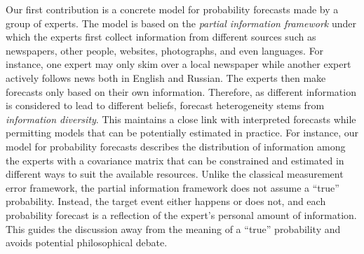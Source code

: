 \documentclass[11pt]{article}
\theoremstyle{definition}
\theoremstyle{definition}
\begin{document}
Our first contribution is a concrete model for probability forecasts made by a group of experts. The model is based on the \textit{partial information framework} under which the experts first collect information from different sources such as newspapers, other people, websites, photographs, and even languages. For instance, one expert may only skim over a local newspaper while another expert actively follows news both in English and Russian. The experts then make forecasts only based on their own information.
Therefore, as different information is considered to lead to different beliefs, forecast heterogeneity stems from \textit{information diversity}. This maintains a close link with interpreted forecasts while permitting models that can be potentially estimated in practice. For instance, our model for probability forecasts describes the distribution of information among the experts with a covariance matrix that can be constrained and estimated in different ways to suit the available resources.  Unlike the classical measurement error framework, the partial information framework does not assume a ``true'' probability. Instead, the target event either happens or does not, and each probability forecast is a reflection of the expert's personal amount of information. This guides the discussion away from the meaning of a ``true'' probability and avoids potential philosophical debate.

\end{document}
